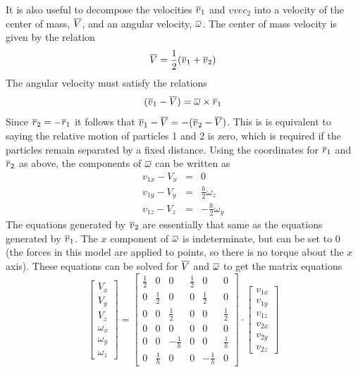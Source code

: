\documentclass[12pt]{article}
\begin{document}
It is also useful to decompose the velocities $\overline{v}_1$ and $vvec_2$ into a velocity
of the center of mass, $\overline{V}$, and an angular velocity, $\overline{\omega}$. The center of mass
velocity is given by the relation
\[
\overline{V} = \frac{1}{2}(\overline{v}_1+\overline{v}_2)
\]
The angular velocity must satisfy the relations
\[
(\overline{v}_1-\overline{V}) = \overline{\omega}\times\overline{r}_1
\]
Since $\overline{r}_2=-\overline{r}_1$ it follows that $\overline{v}_1-\overline{V}=-(\overline{v}_2-\overline{V})$. This is
is equivalent to saying the relative motion of particles 1 and 2 is zero, which is
required if the particles remain separated by a fixed distance. Using the
coordinates for $\overline{r}_1$ and $\overline{r}_2$ as above, the components of $\overline{\omega}$ can be
written as
\begin{eqnarray*}
v_{1x}-V_x & = & 0 \\
v_{1y}-V_y & = & \frac{h}{2} \omega_z \\
v_{1z}-V_z & = & -\frac{h}{2} \omega_y
\end{eqnarray*}
The equations generated by $\overline{v}_2$ are essentially that same as the equations
generated by $\overline{v}_1$. The $x$ component of $\overline{\omega}$ is indeterminate, but can be
set to 0 (the forces in this model are applied to points, so there is no torque
about the $x$ axis). These equations can be solved for $\overline{V}$ and $\overline{\omega}$ to get
the matrix equations
\[
\left[\begin{array}{c}V_x \\ V_y \\ V_z \\ \omega_x \\ \omega_y \\ \omega_z
 \end{array}\right] =
\left[\begin{array}{cccccc}
\frac{1}{2} & 0 & 0 & \frac{1}{2} & 0 & 0 \\
0 & \frac{1}{2} & 0 & 0 & \frac{1}{2} & 0 \\
0 & 0 & \frac{1}{2} & 0 & 0 & \frac{1}{2} \\
0 & 0 & 0 & 0 & 0 & 0 \\
0 & 0 & -\frac{1}{h} & 0 & 0 & \frac{1}{h} \\
0 & \frac{1}{h} & 0 & 0  &-\frac{1}{h} & 0
\end{array}\right]\cdot
\left[\begin{array}{c} v_{1x} \\ v_{1y} \\ v_{1z} \\ v_{2x} \\ v_{2y} \\ v_{2z}
\end{array}\right]
\]


\end{document}
